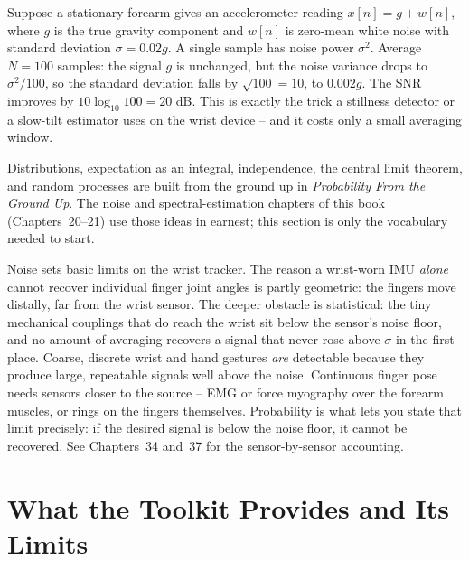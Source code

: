 \begin{example}
\label{ch42:ex-averaging}
Suppose a stationary forearm gives an accelerometer reading $x[n] = g + w[n]$, where $g$ is the
true gravity component and $w[n]$ is zero-mean white noise with standard deviation $\sigma =
0.02g$. A single sample has noise power $\sigma^2$. Average $N = 100$ samples: the signal $g$ is
unchanged, but the noise variance drops to $\sigma^2/100$, so the standard deviation falls by
$\sqrt{100} = 10$, to $0.002g$. The SNR improves by $10\log_{10}100 = 20$ dB. This is exactly the
trick a stillness detector or a slow-tilt estimator uses on the wrist device -- and it costs only
a small averaging window.
\end{example}

\begin{connectionbox}
Distributions, expectation as an integral, independence, the central limit theorem, and random
processes are built from the ground up in \emph{Probability From the Ground Up}. The noise and
spectral-estimation chapters of this book (Chapters~20--21) use those ideas in earnest; this
section is only the vocabulary needed to start.
\end{connectionbox}

\begin{goalbox}
Noise sets basic limits on the wrist tracker. The reason a wrist-worn IMU \emph{alone}
cannot recover individual finger joint angles is partly geometric: the fingers move
distally, far from the wrist sensor. The deeper obstacle is statistical: the tiny mechanical couplings that
do reach the wrist sit below the sensor's noise floor, and no amount of averaging recovers
a signal that never rose above $\sigma$ in the first place. Coarse, discrete wrist and
hand gestures \emph{are} detectable because they produce large, repeatable signals well above the
noise. Continuous finger pose needs sensors closer to the source -- EMG or force myography over
the forearm muscles, or rings on the fingers themselves. Probability is what lets you state that
limit precisely: if the desired signal is below the noise floor, it cannot be recovered.
See Chapters~34 and~37 for the sensor-by-sensor accounting.
\end{goalbox}

\section{What the Toolkit Provides and Its Limits}
\label{ch42:capabilities-road-ahead}

